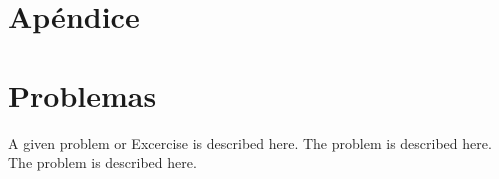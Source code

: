 \section*{Apéndice}

\section*{Problemas}
\begin{prob}
\label{prob1}
A given problem or Excercise is described here. The
problem is described here. The problem is described here.
\end{prob}